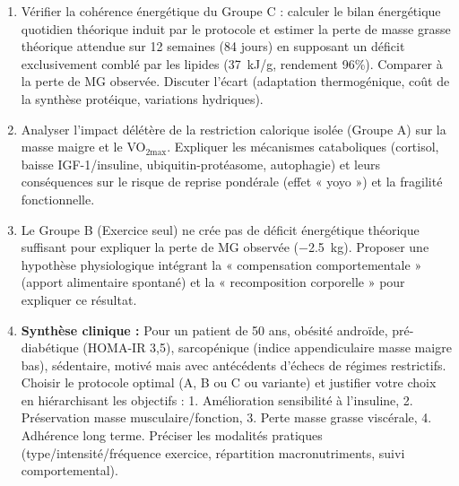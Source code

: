 \documentclass[11pt]{article}
\begin{document}
\begin{exercice}
\begin{enumerate}
    \item Vérifier la cohérence énergétique du Groupe C : calculer le bilan énergétique quotidien théorique induit par le protocole et estimer la perte de masse grasse théorique attendue sur 12 semaines (84 jours) en supposant un déficit exclusivement comblé par les lipides (\SI{37}{kJ/g}, rendement 96\%). Comparer à la perte de MG observée. Discuter l'écart (adaptation thermogénique, coût de la synthèse protéique, variations hydriques).
    \item Analyser l'impact délétère de la restriction calorique isolée (Groupe A) sur la masse maigre et le VO$_{2\text{max}}$. Expliquer les mécanismes cataboliques (cortisol, baisse IGF-1/insuline, ubiquitin-protéasome, autophagie) et leurs conséquences sur le risque de reprise pondérale (effet « yoyo ») et la fragilité fonctionnelle.
    \item Le Groupe B (Exercice seul) ne crée pas de déficit énergétique théorique suffisant pour expliquer la perte de MG observée (\SI{-2,5}{kg}). Proposer une hypothèse physiologique intégrant la « compensation comportementale » (apport alimentaire spontané) et la « recomposition corporelle » pour expliquer ce résultat.
    \item \textbf{Synthèse clinique :} Pour un patient de 50 ans, obésité androïde, pré-diabétique (HOMA-IR 3,5), sarcopénique (indice appendiculaire masse maigre bas), sédentaire, motivé mais avec antécédents d'échecs de régimes restrictifs. Choisir le protocole optimal (A, B ou C ou variante) et justifier votre choix en hiérarchisant les objectifs : 1. Amélioration sensibilité à l'insuline, 2. Préservation masse musculaire/fonction, 3. Perte masse grasse viscérale, 4. Adhérence long terme. Préciser les modalités pratiques (type/intensité/fréquence exercice, répartition macronutriments, suivi comportemental).
\end{enumerate}
\end{exercice}
\end{document}
